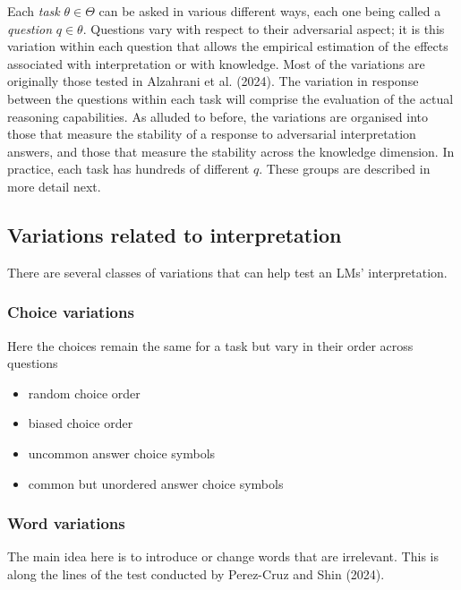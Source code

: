 \documentclass[
]{article}
\begin{document}
Each \emph{task} \(\theta \in \Theta\) can be asked in various different
ways, each one being called a \emph{question} \(q \in \theta\).
Questions vary with respect to their adversarial aspect; it is this
variation within each question that allows the empirical estimation of
the effects associated with interpretation or with knowledge. Most of
the variations are originally those tested in Alzahrani et al. (2024).
The variation in response between the questions within each task will
comprise the evaluation of the actual reasoning capabilities. As alluded
to before, the variations are organised into those that measure the
stability of a response to adversarial interpretation answers, and those
that measure the stability across the knowledge dimension. In practice,
each task has hundreds of different \(q\). These groups are described in
more detail next.

\subsection{Variations related to
interpretation}\label{variations-related-to-interpretation}

There are several classes of variations that can help test an LMs'
interpretation.

\subsubsection{Choice variations}\label{choice-variations}

Here the choices remain the same for a task but vary in their order
across questions

\begin{itemize}
\item
  random choice order
\item
  biased choice order
\item
  uncommon answer choice symbols
\item
  common but unordered answer choice symbols
\end{itemize}

\subsubsection{Word variations}\label{word-variations}

The main idea here is to introduce or change words that are irrelevant.
This is along the lines of the test conducted by Perez-Cruz and Shin
(2024).
\end{document}
